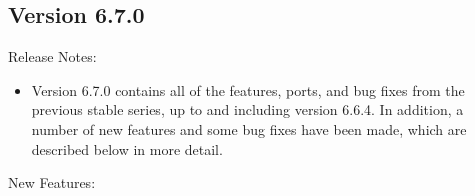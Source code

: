 \subsection{\label{sec:New-6-7-0}Version 6.7.0}

\noindent Release Notes:

\begin{itemize}

\item Version 6.7.0 contains all of the features, ports, and bug fixes
  from the previous stable series, up to and including version 6.6.4.
  In addition, a number of new features and some bug fixes have been
  made, which are described below in more detail.

\end{itemize}


\noindent New Features:

